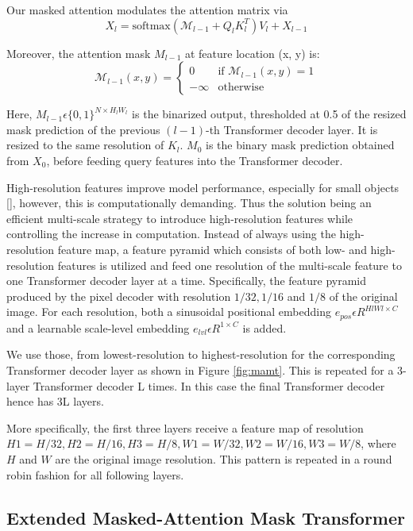Our masked attention modulates the attention matrix via
\[X_l = \text{softmax}(\mathcal{M}_{l-1} + Q_l K_l^T) V_l + X_{l-1}\]

Moreover, the attention mask $M_{l-1}$ at feature location (x, y) is:
\[
    \mathcal{M}_{l-1}(x, y) = 
    \begin{cases} 
    0 & \text{if } \mathcal{M}_{l-1}(x, y) = 1 \\
    -\infty & \text{otherwise} 
    \end{cases}    
\]

Here, $M_{l-1} \epsilon \{0, 1\}^{N \times H_l W_l}$  is the binarized output, thresholded at 0.5 of the resized mask prediction of the previous $(l - 1)$-th 
Transformer decoder layer. It is resized to the same resolution of $K_l$. $M_0$ is the binary mask prediction obtained from $X_0$, before feeding query features
into the Transformer decoder.

High-resolution features improve model performance, especially for small objects [], however, this is computationally demanding. 
Thus the solution being an efficient multi-scale strategy to introduce high-resolution features while controlling the increase in computation. 
Instead of always using the high-resolution feature map, a feature pyramid which consists of both low- and high-resolution features is utilized and 
feed one resolution of the  multi-scale feature to one Transformer decoder layer at a time. Specifically, the feature pyramid produced by the 
pixel decoder with resolution $1/32, 1/16$ and $1/8$ of the original image. For each resolution, both a sinusoidal positional embedding 
$e_{pos} \epsilon R^{HlWl×C}$ and a learnable scale-level embedding $e_{lvl} \epsilon R^{1 \times C}$ is added. 

We use those, from lowest-resolution to highest-resolution for the corresponding Transformer decoder layer as shown in Figure \ref{fig:mamt}. This is 
repeated for a 3-layer Transformer decoder L times. In this case the final Transformer decoder hence has 3L layers. 

More specifically, the first three layers receive a feature map of resolution $H1 = H/32, H2 = H/16, H3 = H/8, W1 = W/32, W2 = W/16, W3 = W/8$, 
where $H$ and $W$ are the original image resolution. This pattern is repeated in a round robin fashion for all following layers.

\newpage
\subsection{Extended Masked-Attention Mask Transformer}

